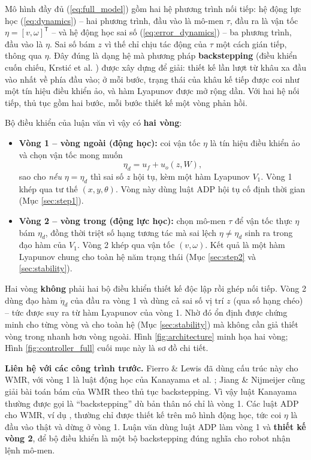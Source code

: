 \documentclass[12pt,a4paper]{article}
\newcommand{\T}{\mathsf{T}}
\begin{document}
Mô hình đầy đủ (\ref{eq:full_model}) gồm hai hệ phương trình nối tiếp: hệ động lực học (\ref{eq:dynamics}) -- hai phương trình, đầu vào là mô-men $\tau$, đầu ra là vận tốc $\eta = [v, \omega]^\T$ -- và hệ động học sai số (\ref{eq:error_dynamics}) -- ba phương trình, đầu vào là $\eta$. Sai số bám $z$ vì thế chỉ chịu tác động của $\tau$ một cách gián tiếp, thông qua $\eta$. Đây đúng là dạng hệ mà phương pháp \textbf{backstepping} (điều khiển cuốn chiếu, Krstić et al. \cite{Krstic1995}) được xây dựng để giải: thiết kế lần lượt từ khâu xa đầu vào nhất về phía đầu vào; ở mỗi bước, trạng thái của khâu kế tiếp được coi như một tín hiệu điều khiển ảo, và hàm Lyapunov được mở rộng dần. Với hai hệ nối tiếp, thủ tục gồm hai bước, mỗi bước thiết kế một vòng phản hồi.

Bộ điều khiển của luận văn vì vậy có \textbf{hai vòng}:
\begin{itemize}
    \item \textbf{Vòng 1 -- vòng ngoài (động học):} coi vận tốc $\eta$ là tín hiệu điều khiển ảo và chọn vận tốc mong muốn
    \begin{equation}\label{eq:virtual_control}
        \eta_d = u_f + u_o(z, W),
    \end{equation}
    sao cho \textit{nếu} $\eta = \eta_d$ thì sai số $z$ hội tụ, kèm một hàm Lyapunov $V_1$. Vòng 1 khép qua tư thế $(x, y, \theta)$. Vòng này dùng luật ADP hội tụ cố định thời gian (Mục \ref{sec:step1}).
    \item \textbf{Vòng 2 -- vòng trong (động lực học):} chọn mô-men $\tau$ để vận tốc thực $\eta$ bám $\eta_d$, đồng thời triệt số hạng tương tác mà sai lệch $\eta \neq \eta_d$ sinh ra trong đạo hàm của $V_1$. Vòng 2 khép qua vận tốc $(v, \omega)$. Kết quả là một hàm Lyapunov chung cho toàn hệ năm trạng thái (Mục \ref{sec:step2} và \ref{sec:stability}).
\end{itemize}

Hai vòng \textbf{không} phải hai bộ điều khiển thiết kế độc lập rồi ghép nối tiếp. Vòng 2 dùng đạo hàm $\dot\eta_d$ của đầu ra vòng 1 và dùng cả sai số vị trí $z$ (qua số hạng chéo) -- tức được suy ra từ hàm Lyapunov của vòng 1. Nhờ đó ổn định được chứng minh cho từng vòng và cho toàn hệ (Mục \ref{sec:stability}) mà không cần giả thiết vòng trong nhanh hơn vòng ngoài. Hình \ref{fig:architecture} minh họa hai vòng; Hình \ref{fig:controller_full} cuối mục này là sơ đồ chi tiết.

\textbf{Liên hệ với các công trình trước.} Fierro \& Lewis \cite{Fierro1997} đã dùng cấu trúc này cho WMR, với vòng 1 là luật động học của Kanayama et al. \cite{Kanayama1990}; Jiang \& Nijmeijer \cite{Jiang1997} cũng giải bài toán bám của WMR theo thủ tục backstepping. Vì vậy luật Kanayama thường được gọi là ``backstepping'' dù bản thân nó chỉ là vòng 1. Các luật ADP cho WMR, ví dụ \cite{Wang2025}, thường chỉ được thiết kế trên mô hình động học, tức coi $\eta$ là đầu vào thật và dừng ở vòng 1. Luận văn dùng luật ADP làm vòng 1 và \textbf{thiết kế vòng 2}, để bộ điều khiển là một bộ backstepping đúng nghĩa cho robot nhận lệnh mô-men.
\end{document}
